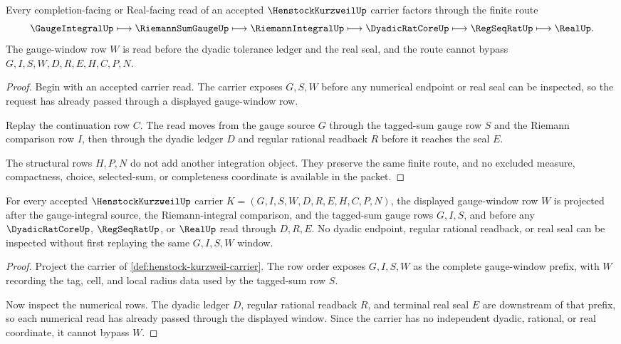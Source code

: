 \begin{theorem}
\label{thm:henstock-kurzweil-gauge-window-route}
Every completion-facing or Real-facing read of an accepted $\HenstockKurzweilUp$ carrier factors through the finite route
$$
\GaugeIntegralUp \longmapsto \RiemannSumGaugeUp \longmapsto \RiemannIntegralUp \longmapsto \DyadicRatCoreUp \longmapsto \RegSeqRatUp \longmapsto \RealUp .
$$
The gauge-window row $W$ is read before the dyadic tolerance ledger and the real seal, and the route cannot bypass $G,I,S,W,D,R,E,H,C,P,N$.
\end{theorem}
\begin{proof}
Begin with an accepted carrier read. The carrier exposes $G,S,W$ before any numerical endpoint or real seal can be inspected, so the request has already passed through a displayed gauge-window row.

Replay the continuation row $C$. The read moves from the gauge source $G$ through the tagged-sum gauge row $S$ and the Riemann comparison row $I$, then through the dyadic ledger $D$ and regular rational readback $R$ before it reaches the seal $E$.

The structural rows $H,P,N$ do not add another integration object. They preserve the same finite route, and no excluded measure, compactness, choice, selected-sum, or completeness coordinate is available in the packet.
\end{proof}

\begin{theorem}
\label{thm:henstock-kurzweil-gauge-window-exactness}
For every accepted $\HenstockKurzweilUp$ carrier $K=(G,I,S,W,D,R,E,H,C,P,N)$, the displayed gauge-window row $W$ is projected after the gauge-integral source, the Riemann-integral comparison, and the tagged-sum gauge rows $G,I,S$, and before any $\DyadicRatCoreUp$, $\RegSeqRatUp$, or $\RealUp$ read through $D,R,E$. No dyadic endpoint, regular rational readback, or real seal can be inspected without first replaying the same $G,I,S,W$ window.
\end{theorem}
\begin{proof}
Project the carrier of \autoref{def:henstock-kurzweil-carrier}. The row order exposes $G,I,S,W$ as the complete gauge-window prefix, with $W$ recording the tag, cell, and local radius data used by the tagged-sum row $S$.

Now inspect the numerical rows. The dyadic ledger $D$, regular rational readback $R$, and terminal real seal $E$ are downstream of that prefix, so each numerical read has already passed through the displayed window. Since the carrier has no independent dyadic, rational, or real coordinate, it cannot bypass $W$.
\end{proof}

